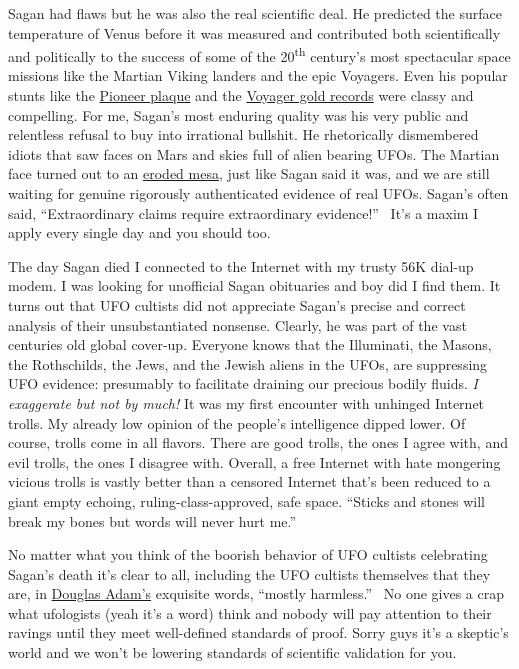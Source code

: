 Sagan had flaws but he was also the real scientific deal. He predicted
the surface temperature of Venus before it was measured and contributed
both scientifically and politically to the success of some of the
20\textsuperscript{th} century's most spectacular space missions like
the Martian Viking landers and the epic Voyagers. Even his popular
stunts like the
\href{https://www.space.com/17651-pioneer-10.html}{Pioneer plaque} and
the \href{https://voyager.jpl.nasa.gov/golden-record/}{Voyager gold
records} were classy and compelling. For me, Sagan's most enduring
quality was his very public and relentless refusal to buy into
irrational bullshit. He rhetorically dismembered idiots that saw faces
on Mars and skies full of alien bearing UFOs. The Martian face turned
out to an
\href{https://science.nasa.gov/science-news/science-at-nasa/2001/ast24may_1/}{eroded
mesa}, just like Sagan said it was, and we are still waiting for genuine
rigorously authenticated evidence of real UFOs. Sagan's often said,
``Extraordinary claims require extraordinary evidence!''~ It's a maxim I
apply every single day and you should too.

The day Sagan died I connected to the Internet with my trusty 56K
dial-up modem. I was looking for unofficial Sagan obituaries and boy did
I find them. It turns out that UFO cultists did not appreciate Sagan's
precise and correct analysis of their unsubstantiated nonsense. Clearly,
he was part of the vast centuries old global cover-up. Everyone knows
that the Illuminati, the Masons, the Rothschilds, the Jews, and the
Jewish aliens in the UFOs, are suppressing UFO evidence: presumably to
facilitate draining our precious bodily fluids. \emph{I exaggerate but
not by much!} It was my first encounter with unhinged Internet trolls.
My already low opinion of the people's intelligence dipped lower. Of
course, trolls come in all flavors. There are good trolls, the ones I
agree with, and evil trolls, the ones I disagree with. Overall, a free
Internet with hate mongering vicious trolls is vastly better than a
censored Internet that's been reduced to a giant empty echoing,
ruling-class-approved, safe space. ``Sticks and stones will break my
bones but words will never hurt me.''

No matter what you think of the boorish behavior of UFO cultists
celebrating Sagan's death it's clear to all, including the UFO cultists
themselves that they are, in \href{https://douglasadams.com/creations/}{Douglas Adam's} exquisite words, ``mostly
harmless.''~ No one gives a crap what ufologists (yeah it's a word)
think and nobody will pay attention to their ravings until they meet
well-defined standards of proof. Sorry guys it's a skeptic's world and
we won't be lowering standards of scientific validation for you.


